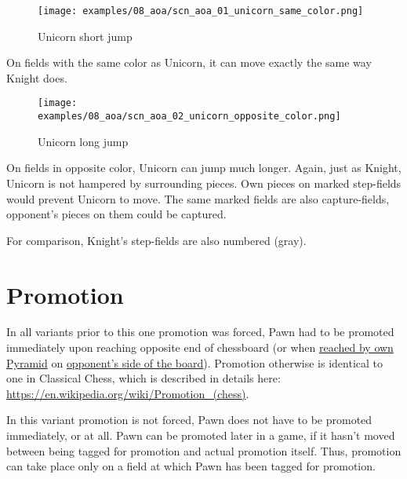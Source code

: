 \noindent
\begin{wrapfigure}{l}{0.4\textwidth}
\centering
\texttt{[image: examples/08\_aoa/scn\_aoa\_01\_unicorn\_same\_color.png]}
\caption{Unicorn short jump}
\label{fig:scn_aoa_01_unicorn_same_color}
\end{wrapfigure}
On fields with the same color as Unicorn, it can move exactly the
same way Knight does.

\clearpage %

\noindent
\begin{figure}[!h]
\texttt{[image: examples/08\_aoa/scn\_aoa\_02\_unicorn\_opposite\_color.png]}
\caption{Unicorn long jump}
\label{fig:scn_aoa_02_unicorn_opposite_color}
\end{figure}

On fields in opposite color, Unicorn can jump much longer. Again, just as
Knight, Unicorn is not hampered by surrounding pieces. Own pieces on marked
step-fields would prevent Unicorn to move. The same marked fields are also
capture-fields, opponent's pieces on them could be captured.

For comparison, Knight's step-fields are also numbered (gray).

\clearpage %

\section*{Promotion}
\label{sec:Age of Aquarius/Promotion}

In all variants prior to this one promotion was forced, Pawn had to be
promoted immediately upon reaching opposite end of chessboard (or when
\hyperref[sec:Mayan Ascendancy/Pyramid/Promotion]{reached by own Pyramid} on
\hyperref[sec:Definitions/Sides of chessboard]{opponent's side of the board}).
Promotion otherwise is identical to one in Classical Chess, which is
described in details here: \\
\href{https://en.wikipedia.org/wiki/Promotion\_(chess)}{https://en.wikipedia.org/wiki/Promotion\_(chess)}.

In this variant promotion is not forced, Pawn does not have to be promoted
immediately, or at all. Pawn can be promoted later in a game, if it hasn't
moved between being tagged for promotion and actual promotion itself. Thus,
promotion can take place only on a field at which Pawn has been tagged for
promotion.

